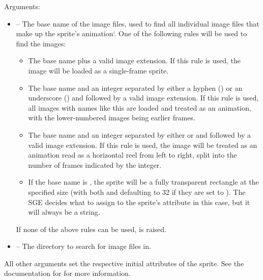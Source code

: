 \documentclass[letterpaper,10pt,english]{sphinxmanual}
\begin{document}
\begin{fulllineitems}
\label{gfx:sge.gfx.Sprite.__init__}
Arguments:
\begin{itemize}
\item {} 
 -- The base name of the image files, used to find all
individual image files that make up the sprite's animation{}`.
One of the following rules will be used to find the images:
\begin{itemize}
\item {} 
The base name plus a valid image extension.  If this rule is
used, the image will be loaded as a single-frame sprite.

\item {} 
The base name and an integer separated by either a hyphen
(\code{-}) or an underscore (\code{\_}) and followed by a valid
image extension.  If this rule is used, all images with
names like this are loaded and treated as an animation, with
the lower-numbered images being earlier frames.

\item {} 
The base name and an integer separated by either 
or  and followed by a valid image extension.  If
this rule is used, the image will be treated as an animation
read as a horizontal reel from left to right, split into the
number of frames indicated by the integer.

\item {} 
If the base name is , the sprite will be a
fully transparent rectangle at the specified size (with both
 and  defaulting to 32 if they are set to
).  The SGE decides what to assign to the
sprite's {\hyperref[gfx:sge.gfx.Sprite.name]{\emph{}}} attribute in this case, but it will
always be a string.

\end{itemize}

If none of the above rules can be used,  is
raised.

\item {} 
 -- The directory to search for image files in.

\end{itemize}

All other arguments set the respective initial attributes of the
sprite.  See the documentation for {\hyperref[gfx:sge.gfx.Sprite]{\emph{}}} for more
information.

\end{fulllineitems}
\end{document}
